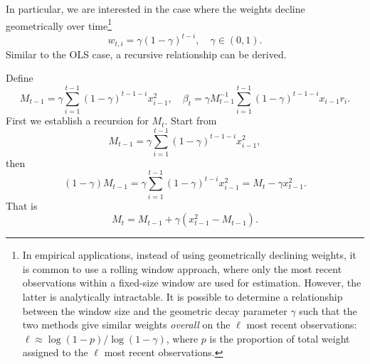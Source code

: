 \documentclass[11pt]{article}
\begin{document}
In particular, we are interested in the case where the weights decline geometrically over time\footnote{
    In empirical applications, instead of using geometrically declining weights, it is common to use a rolling window approach, where only the most recent observations within a fixed-size window are used for estimation. 
    However, the latter is analytically intractable.
    It is possible to determine a relationship between the window size and the geometric decay parameter $\gamma$ such that the two methods give similar weights \emph{overall} on the $\ell$ most recent observations:
    $\ell \approx \log(1 - p) / \log(1 - \gamma)$, where $p$ is the proportion of total weight assigned to the $\ell$ most recent observations.
}
\begin{equation}
    w_{t,i} = \gamma (1 - \gamma)^{t-i}, \quad \gamma \in (0,1).
\end{equation}
Similar to the OLS case, a recursive relationship can be derived.

Define 
\begin{equation}
    M_{t-1} = \gamma \sum^{t-1}_{i=1} {(1 - \gamma)^{t-1-i}} x_{i-1}^2, \quad \beta_{t} = \gamma M^{-1}_{t-1} \sum^{t-1}_{i=1} {(1 - \gamma)^{t-1-i}} x_{i-1} r_i.
\end{equation}
First we establish a recursion for $M_t$. Start from
\begin{equation}
M_{t-1} = \gamma \sum^{t-1}_{i=1} {(1 - \gamma)^{t-1-i}} x_{i-1}^2,
\end{equation}
then
\begin{equation}
(1 - \gamma) M_{t-1} = \gamma \sum^{t-1}_{i=1} {(1 - \gamma)^{t-i}} x_{i-1}^2 = M_t - \gamma x_{t-1}^2.
\end{equation}
That is
\begin{equation}
    M_t = M_{t-1} + \gamma \left(x_{t-1}^2 - M_{t-1} \right).
\end{equation}
\end{document}
